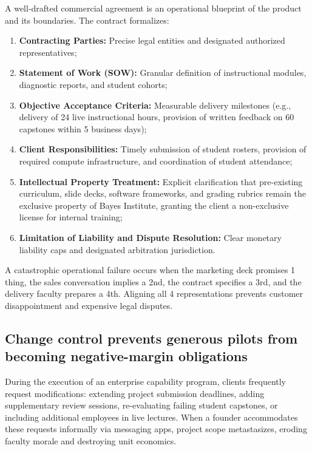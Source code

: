 A well-drafted commercial agreement is an operational blueprint of the product and its boundaries. The contract formalizes:
\begin{enumerate}
\item \textbf{Contracting Parties:} Precise legal entities and designated authorized representatives;
\item \textbf{Statement of Work (SOW):} Granular definition of instructional modules, diagnostic reports, and student cohorts;
\item \textbf{Objective Acceptance Criteria:} Measurable delivery milestones (e.g., delivery of 24 live instructional hours, provision of written feedback on 60 capstones within 5 business days);
\item \textbf{Client Responsibilities:} Timely submission of student rosters, provision of required compute infrastructure, and coordination of student attendance;
\item \textbf{Intellectual Property Treatment:} Explicit clarification that pre-existing curriculum, slide decks, software frameworks, and grading rubrics remain the exclusive property of Bayes Institute, granting the client a non-exclusive license for internal training;
\item \textbf{Limitation of Liability and Dispute Resolution:} Clear monetary liability caps and designated arbitration jurisdiction.
\end{enumerate}
A catastrophic operational failure occurs when the marketing deck promises 1 thing, the sales conversation implies a 2nd, the contract specifies a 3rd, and the delivery faculty prepares a 4th. Aligning all 4 representations prevents customer disappointment and expensive legal disputes.

\subsection{Change control prevents generous pilots from becoming negative-margin obligations}

During the execution of an enterprise capability program, clients frequently request modifications: extending project submission deadlines, adding supplementary review sessions, re-evaluating failing student capstones, or including additional employees in live lectures. When a founder accommodates these requests informally via messaging apps, project scope metastasizes, eroding faculty morale and destroying unit economics.

